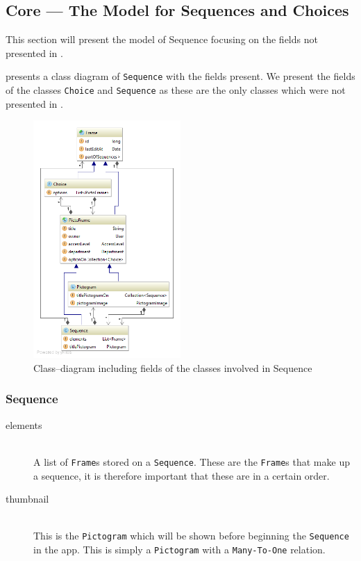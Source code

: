 \subsection{Core --- The Model for Sequences and Choices}\label{subsec:seqcore}
This section will present the model of Sequence focusing on the fields not presented in .

 presents a class diagram of \texttt{Sequence} with the fields present.
We present the fields of the classes \texttt{Choice} and \texttt{Sequence} as these are the only classes which were not presented in .

\begin{figure}[h]
    \centering
    \includegraphics[width=0.5\textwidth]{figures/diagram-sequence-with-fields.png}
    \caption{Class--diagram including fields of the classes involved in Sequence}\label{fig:sequencemodel}
\end{figure}

\subsubsection{Sequence}
\begin{description}
	\item[elements] \hfill \\
    A list of \texttt{Frame}s stored on a \texttt{Sequence}.
	These are the \texttt{Frame}s that make up a sequence, it is therefore important that these are in a certain order.
	\item[thumbnail] \hfill \\
    This is the \texttt{Pictogram} which will be shown before beginning the \texttt{Sequence} in the app.
	This is simply a \texttt{Pictogram} with a \texttt{Many-To-One} relation.
\end{description}

